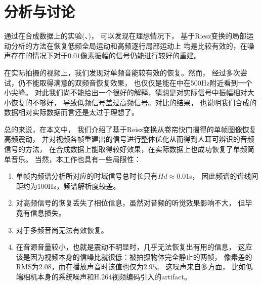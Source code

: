 
\section{分析与讨论}
通过在合成数据上的实验(、)，
可以发现在理想情况下，
基于Riesz变换的局部运动分析的方法在恢复低频全局运动和高频逐行局部运动上
均是比较有效的，在噪声存在的情况下对于$0.01$像素振幅的信号仍能进行较好的重建。

在实际拍摄的视频上，我们发现对单频音能较有效的恢复。然而，
经过多次尝试，仍不能取得满意的双频音恢复效果，
也仅仅是能在中在500Hz附近看到一个小尖峰。
对此我们尚不能给出一个很好的解释，猜想是对实际信号中振幅相对大小恢复的不够好，
导致低频信号盖过高频信号。对比的结果，
也说明我们合成的数据相对实际数据而言还是太过于理想了。

总的来说，在本文中，
我们介绍了基于Reisz变换从卷帘快门摄得的单帧图像恢复高频震动，
并对视频各帧重建出的信号进行整体优化从而得到人耳可辨识的音频信号的方法，
在合成数据上能取得较好效果，在实际数据上也成功恢复了单频简单音乐。 
当然，本工作也具有一些局限性：
\begin{enumerate}
    \item 单帧内频谱分析所对应的时域信号总时长只有$Hd \approx 0.01$s，
        因此频谱的谱线间距约为$100$Hz，频谱解析度较差。
    \item 对高频信号的恢复丢失了相位信息，虽然对音频的听觉效果影响不大，
        但毕竟有信息损失。
    \item 对于多频音尚无法有效恢复。
    \item 在音源音量较小，也就是震动不明显时，几乎无法恢复出有用的信息，
        这应该是因为视频本身的信噪比就很低：被拍摄物体完全静止的两帧，
        像素差的RMS为$2.08$，而在播放声音时该值也仅为$2.95$。
        这噪声来自多方面，
        比如低端相机本身的系统噪声和H.264视频编码引入的artifact。
\end{enumerate}

